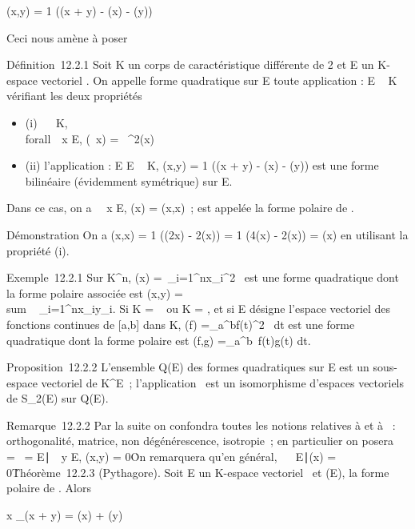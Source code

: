 \documentclass[]{article}
\begin{document}
\phi(x,y) = 1  (\Phi(x + y) - \Phi(x) - \Phi(y))

Ceci nous amène à poser

Définition~12.2.1 Soit K un corps de caractéristique différente de 2 et
E un K-espace vectoriel . On appelle forme quadratique sur E toute
application \Phi : E \rightarrow~ K vérifiant les deux propriétés

\begin{itemize}
\itemsep1pt\parskip0pt
\item
  (i) \forall~\lambda~ \in K, \\forall~~x \in
  E, \Phi(\lambda~x) = \lambda~^2\Phi(x)
\item
  (ii) l'application \phi : E \times E \rightarrow~ K, \phi(x,y) = 1  (\Phi(x + y) - \Phi(x) - \Phi(y)) est une forme bilinéaire (évidemment
  symétrique) sur E.
\end{itemize}

Dans ce cas, on a \forall~~x \in E, \Phi(x) = \phi(x,x)~; \phi
est appelée la forme polaire de \Phi.

Démonstration On a \phi(x,x) = 1  (\Phi(2x) - 2\Phi(x))
= 1  (4\Phi(x) - 2\Phi(x)) = \Phi(x) en utilisant la
propriété (i).

Exemple~12.2.1 Sur K^n, \Phi(x) =\
\sum  _i=1^nx_i^2~
est une forme quadratique dont la forme polaire associée est \phi(x,y)
= \\sum ~
_i=1^nx_iy_i. Si K = ~ ou K = , et si E
désigne l'espace vectoriel des fonctions continues de {[}a,b{]} dans K,
\Phi(f) =\int  _a^bf(t)^2~
dt est une forme quadratique dont la forme polaire est \phi(f,g)
=\int  _a^b~f(t)g(t) dt.

Proposition~12.2.2 L'ensemble Q(E) des formes quadratiques sur E est un
sous-espace vectoriel de K^E~; l'application
\phi\mapsto~\Phi est un isomorphisme d'espaces vectoriels
de S_2(E) sur Q(E).

Remarque~12.2.2 Par la suite on confondra toutes les notions relatives à
\phi et à \Phi~: orthogonalité, matrice, non dégénérescence, isotropie~; en
particulier on posera
\mathrmKer~\Phi
= \mathrmKer~\phi =
\x \in
E∣\forall~~y \in E, \phi(x,y) =
0\. On remarquera qu'en général,
\mathrmKer\Phi\mathrel\neq~~\x
\in E∣\Phi(x) = 0\.

Théorème~12.2.3 (Pythagore). Soit E un K-espace vectoriel ~et \Phi \inQ(E), \phi
la forme polaire de \Phi. Alors

x \bot_\phiy \Leftrightarrow \Phi(x + y) = \Phi(x) + \Phi(y)
\end{document}
